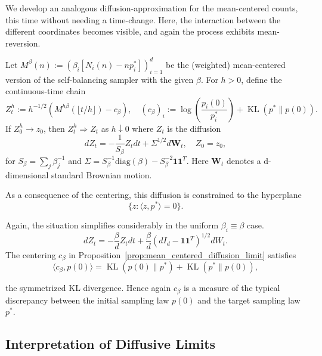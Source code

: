 We develop an analogous diffusion-approximation for the mean-centered counts, this time without needing a time-change. Here, the interaction between the different coordinates becomes visible, and again the process exhibits mean-reversion.


\begin{proposition}
\label{prop:mean_centered_diffusion_limit}
Let $M^\beta(n) := (\beta_i[N_i(n) - np_i^*])_{i=1}^d$ be the (weighted) mean-centered version of the self-balancing sampler with the given $\beta$. For $h > 0$, define the continuous-time chain
%
\[Z^h_t := h^{-1/2}\left(M^{h\beta}(\lfloor t/h\rfloor) - c_\beta\right), \quad (c_\beta)_i := \log\left(\frac{p_i(0)}{p_i^*}\right) + \operatorname{KL}(p^* \| p(0)).\]
%
\noindent If $Z_0^h \to z_0$, then $Z^h_t \Rightarrow Z_t$ as $h \downarrow 0$ where $Z_t$ is the diffusion
%
\[dZ_t = -\frac{1}{S_\beta}Z_t dt + \Sigma^{1/2} d\mathbf{W}_t, \quad Z_0 = z_0,\]
%
\noindent for $S_\beta = \sum_j \beta_j^{-1}$  and $\Sigma = S_\beta^{-1}\mathrm{diag}(\beta)  - S_\beta^{-2} \mathbf{1}\mathbf{1}^T$. Here $\mathbf{W}_t$ denotes a d-dimensional standard Brownian motion.

\end{proposition}


\noindent As a consequence of the centering, this diffusion is constrained to the hyperplane
%
$$\{z : \langle z, p^* \rangle = 0\}.$$

\noindent Again, the situation simplifies considerably in the uniform $\beta_i \equiv \beta$ case.
%
\[dZ_t = -\frac{\beta}{d} Z_t dt + \frac{\beta}{d}(d I_d  - \mathbf{1} \mathbf{1}^T)^{1/2} dW_t.\]
%
\noindent The centering $c_\beta$ in Proposition~\ref{prop:mean_centered_diffusion_limit} satisfies
%
\begin{equation}
    \langle c_\beta, p(0) \rangle = \operatorname{KL}(p(0) \| p^*) + \operatorname{KL}(p^* \| p(0)),
    \label{eqn:c_beta_and_sym_KL_divergence}
\end{equation}

%
\noindent the symmetrized KL divergence. Hence again $c_\beta$ is a measure of the typical discrepancy between the initial sampling law $p(0)$ and the target sampling law $p^*$.

\subsection{Interpretation of Diffusive Limits}

